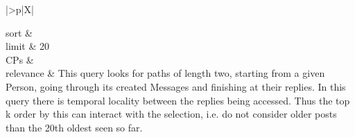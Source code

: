 \begin{tabularx}{\queryCardWidth}{|>{\queryPropertyCell}p{\queryPropertyCellWidth}|X|}
%
	
		sort		&
		\innerCardVSpace \\ \hline
	limit & 20 \\ \hline
	CPs &
	 \\ \hline
	relevance &
		\small This query looks for paths of length two, starting from a given Person, going through its created Messages and
finishing at their replies. In this query there is temporal locality between the replies being accessed. Thus the top k
order by this can interact with the selection, i.e. do not consider older posts than the 20th oldest seen so far.
 \\ \hline%
\end{tabularx}
\queryCardVSpace
